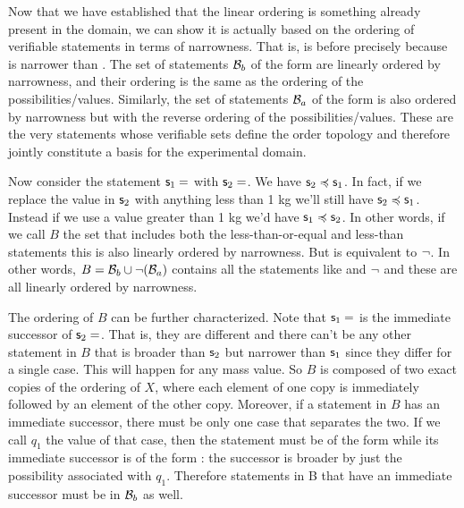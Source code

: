 Now that we have established that the linear ordering is something already present in the domain, we can show it is actually based on the ordering of verifiable statements in terms of narrowness. That is,  is before  precisely because  is narrower than . The set of statements $\mathcal{B}_b$ of the form  are linearly ordered by narrowness, and their ordering is the same as the ordering of the possibilities/values. Similarly, the set of statements $\mathcal{B}_a$ of the form  is also ordered by narrowness but with the reverse ordering of the possibilities/values. These are the very statements whose verifiable sets define the order topology and therefore jointly constitute a basis for the experimental domain.

Now consider the statement $\mathsf{s}_1=$ with $\mathsf{s}_2=$. We have $\mathsf{s}_2 \preccurlyeq \mathsf{s}_1$. In fact, if we replace the value in $\mathsf{s}_2$ with anything less than 1 kg we'll still have $\mathsf{s}_2 \preccurlyeq \mathsf{s}_1$. Instead if we use a value greater than 1 kg we'd have $\mathsf{s}_1 \preccurlyeq \mathsf{s}_2$. In other words, if we call $B$ the set that includes both the less-than-or-equal and less-than statements this is also linearly ordered by narrowness. But  is equivalent to $\neg$. In other words, $B=\mathcal{B}_b \cup \neg(\mathcal{B}_a)$ contains all the statements like  and $\neg$ and these are all linearly ordered by narrowness.

The ordering of $B$ can be further characterized. Note that $\mathsf{s}_1=$ is the immediate successor of $\mathsf{s}_2=$. That is, they are different and there can't be any other statement in $B$ that is broader than $\mathsf{s}_2$ but narrower than $\mathsf{s}_1$ since they differ for a single case. This will happen for any mass value. So $B$ is composed of two exact copies of the ordering of $X$, where each element of one copy is immediately followed by an element of the other copy. Moreover, if a statement in $B$ has an immediate successor, there must be only one case that separates the two. If we call $q_1$ the value of that case, then the statement must be of the form  while its immediate successor is of the form : the successor is broader by just the possibility associated with $q_1$. Therefore statements in B that have an immediate successor must be in $\mathcal{B}_b$ as well.

